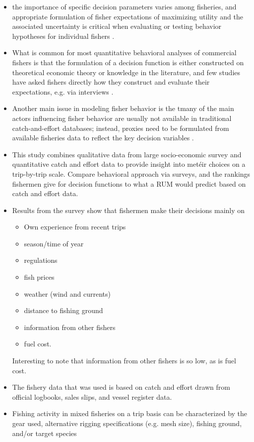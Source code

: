 \documentclass[a4paper,10pt]{report}
\begin{document}
\begin{itemize}
\item the importance of specific decision parameters varies among fisheries, and appropriate formulation of fisher expectations of maximizing utility and the associated uncertainty is critical when evaluating or testing behavior hypotheses for individual fishers \citep{Smith:2000}.
\item What is common for most quantitative behavioral analyses of commercial fishers is that the formulation of a decision function is either constructed on theoretical economic theory or knowledge in the literature, and few studies have asked fishers directly how they construct and evaluate their expectations, e.g. via interviews \citep{HollandSutinen:2000, Salasetal:2004, Abernethyetal:2007}. 
\item Another main issue in modeling fisher behavior is the tmany of the main actors influencing fisher behavior are usually not available in traditional catch-and-effort databases; instead, proxies need to be formulated from available fisheries data to reflect the key decision variables \citep{Smith:2000}. 
\item This study combines qualitative data from large socio-economic survey and quantitative catch and effort data to provide insight into met\'{e}ir choices on a trip-by-trip scale. Compare behavioral approach via surveys, and the rankings fishermen give for decision functions to what a RUM would predict based on catch and effort data. 
\item Results from the survey show that fishermen make their decisions mainly on
\begin{itemize}
\item Own experience from recent trips
\item season/time of year
\item regulations
\item fish prices
\item weather (wind and currents)
\item distance to fishing ground
\item information from other fishers
\item fuel cost.
\end{itemize} 
Interesting to note that information from other fishers is so low, as is fuel cost. 
\item The fishery data that was used is based on catch and effort drawn from official logbooks, sales slips, and vessel register data. 
\item Fishing activity in mixed fisheries on a trip basis can be characterized by the gear used, alternative rigging specifications (e.g. mesh size), fishing ground, and/or target species \citep{PelletierFerraris:2000}

\end{itemize}
\end{document}
